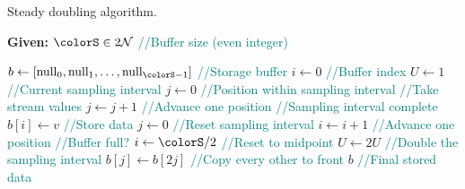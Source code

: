 \begin{algorithm}[H]
\caption{Steady doubling algorithm.}
\label{alg:steady-doubling}
\begin{minipage}{0.5\textwidth}
    \hspace*{\algorithmicindent} \textbf{Given:} $\colorS \in 2\mathcal{N}$ \textcolor{teal}{\small//Buffer size (even integer)}
    \hspace*{\algorithmicindent}    \begin{algorithmic}[1]
        \State $b \gets [\mathrm{null}_0, \mathrm{null}_1, \ldots, \mathrm{null}_{\colorS - 1}]$ \textcolor{teal}{\small//Storage buffer}
        \State $i \gets 0$ \textcolor{teal}{\small//Buffer index}
        \State $U \gets 1$ \textcolor{teal}{\small//Current sampling interval}
        \State $j \gets 0$ \textcolor{teal}{\small//Position within sampling interval}
         \textcolor{teal}{\small//Take stream values}
        \State $j \gets j + 1$  \textcolor{teal}{\small//Advance one position}
          \textcolor{teal}{\small//Sampling interval complete}
        \State $b[i] \gets v$ \textcolor{teal}{\small//Store data}
        \State $j \gets 0$  \textcolor{teal}{\small//Reset sampling interval}
        \State $i \gets i + 1$  \textcolor{teal}{\small//Advance one position}
         \textcolor{teal}{\small//Buffer full?}
        \State $i \gets \colorS / 2$ \textcolor{teal}{\small//Reset to midpoint}
        \State $U \gets 2U$ \textcolor{teal}{\small//Double the sampling interval}
        \For{$j \in [0\twodots \colorS/2)$}
        \State $b[j] \gets b[2j]$ \textcolor{teal}{\small//Copy every other to front}
        \EndFor
        \EndIf
        \EndIf
        \EndFor
        \Return $b$ \textcolor{teal}{\small//Final stored data}
    \end{algorithmic}
\end{minipage}
\end{algorithm}
